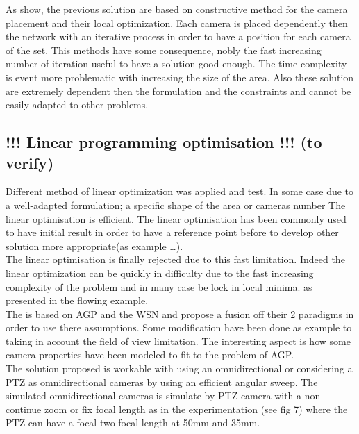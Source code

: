 As show, the previous solution are based on constructive method for the camera placement and their local optimization. Each camera is placed dependently then the network with an iterative process in order to have a position for each camera of the set. This methods have some consequence, nobly the fast increasing number of iteration useful to have a solution good enough. The time complexity is event more problematic with  increasing the size of the area. Also these solution are extremely dependent then the formulation and the constraints and cannot be easily adapted to other problems. 

\subsection{ !!! Linear programming optimisation !!! (to verify)}
	Different method of linear optimization was applied and test. In some case due to a well-adapted formulation; a specific shape of the area or cameras number The linear optimisation is efficient. 
	The linear optimisation has been commonly used to have initial result in order to have a reference point before to develop other solution more appropriate(as example \cite{141*akbarzadeh2013,151*zhao2013,82*chrysostomou2012,33*reddy2012}…).  \\
	 The linear optimisation  is finally rejected due to this fast limitation.  Indeed the linear optimization can be quickly in difficulty due to the fast increasing complexity of the problem and in many case be lock in local minima. as presented in the flowing example.\\

	 
	 
The \cite{43*erdem2006} is based on AGP and the WSN and propose a fusion off their 2 paradigms in order to use there assumptions. Some modification have been done as example to taking in account the field of view limitation. The interesting aspect is how some camera properties have been modeled to fit to the problem of AGP.  \\
The solution proposed is workable with using an omnidirectional or considering a PTZ as omnidirectional cameras by using an efficient angular sweep. The simulated omnidirectional cameras is simulate by PTZ camera with a non-continue zoom or fix focal length as in the  experimentation (see fig 7) where  the PTZ can have a focal two focal length  at 50mm and  35mm. 	 \\
	 

